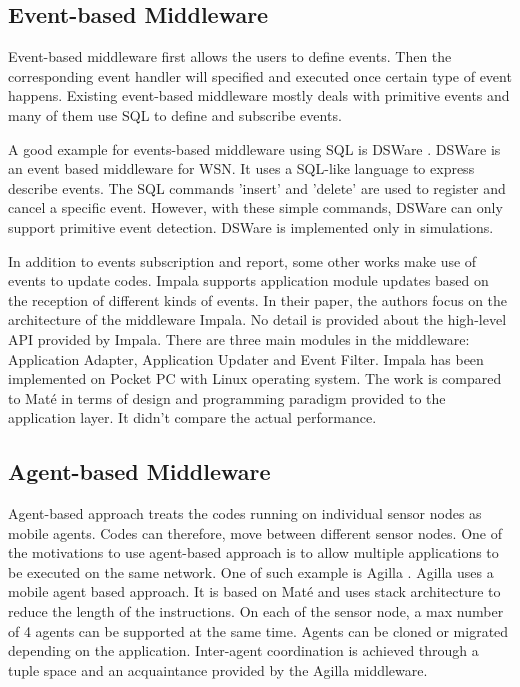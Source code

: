 \subsection{Event-based Middleware}
Event-based middleware first allows the users to define events. Then the corresponding event handler will specified and executed once certain type of event happens. Existing event-based middleware mostly deals with primitive events and many of them use SQL to define and subscribe events. 

A good example for events-based middleware using SQL is DSWare \cite{dsware}. DSWare is an event based middleware for WSN. It uses a SQL-like language to express describe events. The SQL commands 'insert' and 'delete' are used to register and cancel a specific event. However, with these simple commands, DSWare can only support primitive event detection. DSWare is implemented only in simulations.

In addition to events subscription and report, some other works make use of events to update codes. Impala \cite{impala} supports application module updates based on the reception of different kinds of events. In their paper, the authors focus on the architecture of the middleware Impala. No detail is provided about the high-level API provided by Impala. There are three main modules in the middleware: Application Adapter, Application Updater and Event Filter. Impala has been implemented on Pocket PC with Linux operating system. The work is compared to Mat\'{e} in terms of design and programming paradigm provided to the application layer. It didn't compare the actual performance.

\subsection{Agent-based Middleware}
Agent-based approach treats the codes running on individual sensor nodes as mobile agents. Codes can therefore, move between different sensor nodes. One of the motivations to use agent-based approach is to allow multiple applications to be executed on the same network. One of such example is Agilla \cite{agilla}. Agilla uses a mobile agent based approach. It is based on Mat\'{e} and uses stack architecture to reduce the length of the instructions. On each of the sensor node, a max number of 4 agents can be supported at the same time. Agents can be cloned or migrated depending on the application. Inter-agent coordination is achieved through a tuple space and an acquaintance provided by the Agilla middleware.

